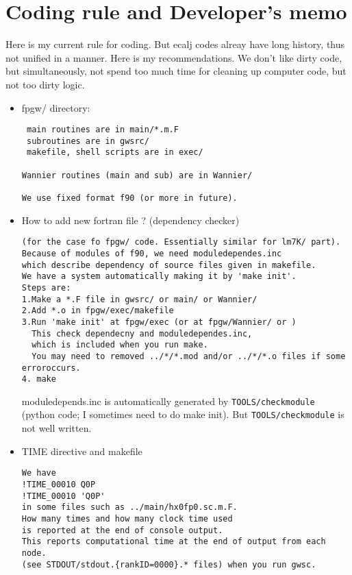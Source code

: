 \documentclass[a4paper,10pt,fleqn]{article}
\begin{document}
\section{Coding rule and Developer's memo}
Here is my current rule for coding.
But ecalj codes alreay have long history, thus not unified in a manner.
Here is my recommendations. We don't like dirty code, but
simultaneously, not spend too much time for cleaning up
computer code, but not too dirty logic. 

\begin{itemize}

\item fpgw/ directory:
\begin{verbatim}
 main routines are in main/*.m.F
 subroutines are in gwsrc/
 makefile, shell scripts are in exec/

Wannier routines (main and sub) are in Wannier/

We use fixed format f90 (or more in future).
\end{verbatim}

\item How to add new fortran file ? (dependency checker)
\begin{verbatim}
(for the case fo fpgw/ code. Essentially similar for lm7K/ part).
Because of modules of f90, we need moduledependes.inc
which describe dependency of source files given in makefile. 
We have a system automatically making it by 'make init'. 
Steps are:
1.Make a *.F file in gwsrc/ or main/ or Wannier/
2.Add *.o in fpgw/exec/makefile
3.Run 'make init' at fpgw/exec (or at fpgw/Wannier/ or )
  This check dependecny and moduledependes.inc,
  which is included when you run make.
  You may need to removed ../*/*.mod and/or ../*/*.o files if some erroroccurs.
4. make
\end{verbatim}
moduledepends.inc is automatically generated by \verb#TOOLS/checkmodule# (python code; I sometimes need to do make init).
But \verb#TOOLS/checkmodule# is not well written.


\item TIME directive and makefile 
\begin{verbatim}
We have 
!TIME_00010 Q0P
!TIME_00010 'Q0P'
in some files such as ../main/hx0fp0.sc.m.F.
How many times and how many clock time used
is reported at the end of console output.
This reports computational time at the end of output from each node.
(see STDOUT/stdout.{rankID=0000}.* files) when you run gwsc.


\end{verbatim}
\end{itemize}
\end{document}

